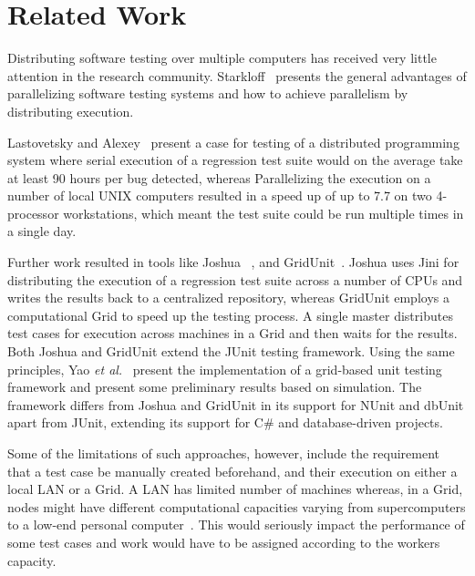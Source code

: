 \section{Related Work}\label{sec:rw}
Distributing software testing over multiple computers has received very little attention in the research community. Starkloff~\cite{stark} presents the general advantages of parallelizing software testing systems and how to achieve parallelism by distributing execution. 

Lastovetsky and Alexey~\cite{lasto} present a case for testing of a distributed programming system where serial execution of a regression test suite would on the average take at least 90 hours per bug detected, whereas Parallelizing the execution on a number of local UNIX computers resulted in a speed up of up to 7.7 on two 4-processor workstations, which meant the test suite could be run multiple times in a single day.

Further work resulted in tools like Joshua ~\cite{Kap}, and GridUnit~\cite{Duarte1, Duarte2, Duarte3}. 
Joshua uses Jini for distributing the execution of a regression test suite across a number of CPUs and 
writes the results back to a centralized repository, whereas GridUnit employs a computational Grid to speed up the testing process. 
A single master distributes test cases for execution across machines in a Grid and then waits for the results.
Both Joshua and GridUnit extend the JUnit testing framework. Using the same principles, Yao \textit{et al.}~\cite{yao} present the implementation of a grid-based unit testing framework and present some preliminary results based on simulation. 
The framework  differs from Joshua and GridUnit in its support for NUnit and dbUnit apart from JUnit, extending its support for C\# and database-driven projects.

Some of the limitations of such approaches, however, include the requirement that a test case be manually created beforehand, and their execution on either a local LAN or a Grid. A LAN has limited number of machines whereas, in a Grid, nodes might have different computational capacities varying from supercomputers to a low-end personal computer~\cite{yao}. This would seriously impact the performance 
of some test cases and work would have to be assigned according to the workers capacity. 

